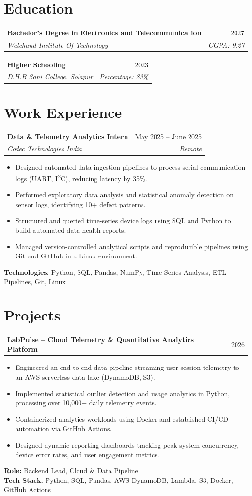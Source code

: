 \documentclass[letterpaper,10pt]{article}
\makeatletter
\newcommand{\resumeItemListStart}{\begin{itemize}[leftmargin=0.18in, topsep=1.5pt, parsep=0pt, itemsep=1pt]}
\newcommand{\resumeItemListEnd}{\end{itemize}\vspace{-4pt}}
\newcommand{\resumeItem}[1]{\item\small{#1}}
\newcommand{\resumeSubheading}[4]{
  \vspace{-1pt}
  \begin{tabular*}{\textwidth}[t]{l@{\extracolsep{\fill}}r}
    \textbf{#1} & #2 \\
    \textit{\small#3} & \textit{\small #4} \\
  \end{tabular*}\vspace{-4pt}
}
\newcommand{\resumeProjectHeading}[2]{
  \vspace{-1pt}
  \begin{tabular*}{\textwidth}[t]{l@{\extracolsep{\fill}}r}
    \textbf{#1} & #2 \\
  \end{tabular*}\vspace{-4pt}
}
\makeatother
\begin{document}
\vspace{-6pt}

\section{Education}
\resumeSubheading
  {Bachelor's Degree in Electronics and Telecommunication}{2027}
  {Walchand Institute Of Technology}{CGPA: 9.27}
\resumeSubheading
  {Higher Schooling}{2023}
  {D.H.B Soni College, Solapur}{Percentage: 83\%}

\vspace{-2pt}

\section{Work Experience}
\resumeSubheading
  {Data \& Telemetry Analytics Intern}{May 2025 -- June 2025}
  {Codec Technologies India}{Remote}
\resumeItemListStart
  \resumeItem{Designed automated data ingestion pipelines to process serial communication logs (UART, I\textsuperscript{2}C), reducing latency by 35\%.}
  \resumeItem{Performed exploratory data analysis and statistical anomaly detection on sensor logs, identifying 10+ defect patterns.}
  \resumeItem{Structured and queried time-series device logs using SQL and Python to build automated data health reports.}
  \resumeItem{Managed version-controlled analytical scripts and reproducible pipelines using Git and GitHub in a Linux environment.}
\resumeItemListEnd
\small{\textbf{Technologies:} Python, SQL, Pandas, NumPy, Time-Series Analysis, ETL Pipelines, Git, Linux}

\vspace{-2pt}

\section{Projects}

\resumeProjectHeading
  {\href{https://github.com/AdityaMittha/LabPulse}{\textbf{LabPulse -- Cloud Telemetry \& Quantitative Analytics Platform}}}{2026}
\resumeItemListStart
  \resumeItem{Engineered an end-to-end data pipeline streaming user session telemetry to an AWS serverless data lake (DynamoDB, S3).}
  \resumeItem{Implemented statistical outlier detection and usage analytics in Python, processing over 10,000+ daily telemetry events.}
  \resumeItem{Containerized analytics workloads using Docker and established CI/CD automation via GitHub Actions.}
  \resumeItem{Designed dynamic reporting dashboards tracking peak system concurrency, device error rates, and user engagement metrics.}
\resumeItemListEnd
\small{\textbf{Role:} Backend Lead, Cloud \& Data Pipeline} \\
\small{\textbf{Tech Stack:} Python, SQL, Pandas, AWS DynamoDB, Lambda, S3, Docker, GitHub Actions}
\end{document}
